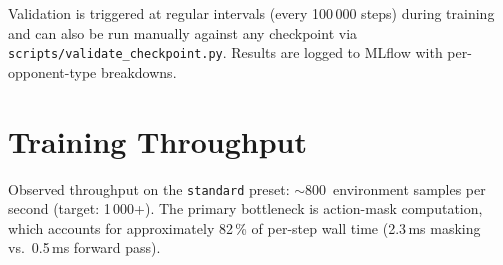Validation is triggered at regular intervals (every 100\,000 steps) during
training and can also be run manually against any checkpoint via
\texttt{scripts/validate\_checkpoint.py}.  Results are logged to MLflow with
per-opponent-type breakdowns.

\section{Training Throughput}

Observed throughput on the \texttt{standard} preset:
$\sim$800~environment samples per second (target: 1\,000+).  The primary
bottleneck is action-mask computation, which accounts for approximately 82\,\%
of per-step wall time (2.3\,ms masking vs.\ 0.5\,ms forward pass).
